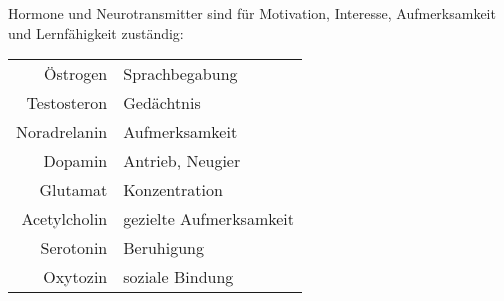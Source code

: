 \documentclass[twocolumn]{article}
\begin{document}
Hormone und Neurotransmitter sind für Motivation, Interesse, Aufmerksamkeit und Lernfähigkeit zuständig:

\begin{center}
    \begin{tabular}{r l}
        Östrogen & Sprachbegabung \\
        Testosteron & Gedächtnis \\
        Noradrelanin & Aufmerksamkeit \\
        Dopamin & Antrieb, Neugier \\
        Glutamat & Konzentration \\
        Acetylcholin & gezielte Aufmerksamkeit \\
        Serotonin & Beruhigung \\
        Oxytozin & soziale Bindung
    \end{tabular}
\end{center}
\end{document}
